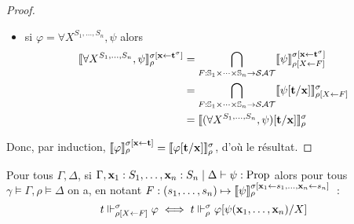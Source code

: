 \documentclass{article}
\begin{document}
\begin{proof}
\begin{itemize}
  \item si $\varphi = \forall X^{S_1,\ldots,S_n}, \psi$ alors
    \begin{align*}
      \llbracket \forall X^{S_1,\ldots,S_n}, \psi \rrbracket_\rho^{\sigma[\mathbf{x}\leftarrow \mathbf{t}^\sigma]} &= \bigcap_{F : \mathbb{S}_1\times\cdots\times \mathbb{S}_n\to \mathcal {SAT}}\llbracket \psi \rrbracket_{\rho[X\leftarrow F]}^{\sigma[\mathbf{x}\leftarrow \mathbf{t}^\sigma]}\\
      &= \bigcap_{F : \mathbb{S}_1\times\cdots\times \mathbb{S}_n \to \mathcal {SAT}}\llbracket \psi[\mathbf{t}/\mathbf{x}] \rrbracket_{\rho[X\leftarrow F]}^\sigma\\
      &= \llbracket (\forall X^{S_1,\ldots,S_n}, \psi)[\mathbf{t}/\mathbf{x}] \rrbracket_\rho^\sigma
    \end{align*}
  \end{itemize}
  Donc, par induction, $\llbracket \varphi \rrbracket_\rho^{\sigma[\mathbf{x}\leftarrow\mathbf{t}]} = \llbracket \varphi[\mathbf{t}/\mathbf{x}] \rrbracket_\rho^\sigma$, d'où le résultat.
\end{proof}

\begin{lem}\label{lem.subst.2}
  Pour tous $\Gamma,\Delta$, si $\Gamma,\mathbf{x}_1 : S_1,\ldots,\mathbf{x}_n : S_n\mid\Delta\vdash \psi : \mathrm{Prop}$ alors pour tous $\gamma\models\Gamma, \rho\models \Delta$ on a, en notant $F : (s_1,\ldots,s_n) \mapsto \llbracket \psi \rrbracket_\rho^{\sigma[\mathbf{x}_1\leftarrow s_1,\ldots,\mathbf{x}_n\leftarrow s_n]}$~:
  \[t\Vdash_{\rho[X\leftarrow F]}^\sigma \varphi \iff t\Vdash_\rho^\sigma \varphi[\psi(\mathbf{x}_1,\ldots,\mathbf{x}_n)/X]\]
\end{lem}
\end{document}
